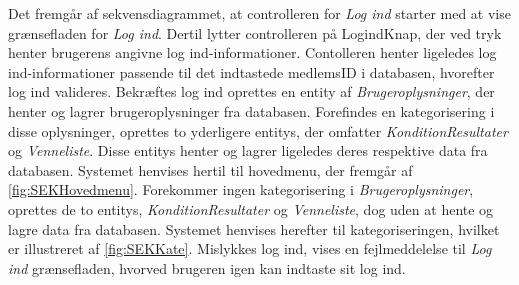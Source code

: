 \noindent
Det fremgår af sekvensdiagrammet, at controlleren for \textit{Log ind} starter med at vise grænsefladen for \textit{Log ind}. Dertil lytter controlleren på LogindKnap, der ved tryk henter brugerens angivne log ind-informationer. Contolleren henter ligeledes log ind-informationer passende til det indtastede medlemsID i databasen, hvorefter log ind valideres. Bekræftes log ind oprettes en entity af \textit{Brugeroplysninger}, der henter og lagrer brugeroplysninger fra databasen. Forefindes en kategorisering i disse oplysninger, oprettes to yderligere entitys, der omfatter \textit{KonditionResultater} og \textit{Venneliste}.  Disse entitys henter og lagrer ligeledes deres respektive data fra databasen. Systemet henvises hertil til hovedmenu, der fremgår af \autoref{fig:SEKHovedmenu}.
Forekommer ingen kategorisering i \textit{Brugeroplysninger}, oprettes de to entitys, \textit{KonditionResultater} og \textit{Venneliste}, dog uden at hente og lagre data fra databasen. Systemet henvises herefter til kategoriseringen, hvilket er illustreret af \autoref{fig:SEKKate}.
Mislykkes log ind, vises en fejlmeddelelse til \textit{Log ind} grænsefladen, hvorved brugeren igen kan indtaste sit log ind.
